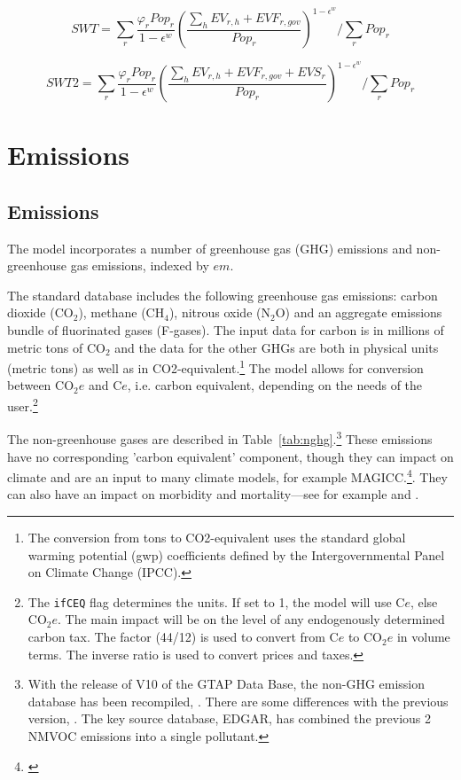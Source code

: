 \documentclass[11pt,letterpaper]{report}
\begin{document}
\begin{equation}
\label{eq:swt}
\mathit{SWT} = \sum_{r}{ \frac{\varphi_r \mathit{Pop}_r}{1-\epsilon^w}
\left(\frac{\sum_h{\mathit{EV}_{r,h}}+\mathit{EVF}_{r,gov}}{\mathit{Pop}_r} \right) }^{1-\epsilon^w} \bigg /
\sum_{r}{\mathit{Pop}_r}
\end{equation}

\begin{equation}
\label{eq:swt2}
\mathit{SWT2} = \sum_{r}{ \frac{\varphi_r \mathit{Pop}_r}{1-\epsilon^w}
\left(\frac{\sum_h{\mathit{EV}_{r,h}}+\mathit{EVF}_{r,gov}
+\mathit{EVS}_r}{\mathit{Pop}_r} \right) }^{1-\epsilon^w} \bigg /
\sum_{r}{\mathit{Pop}_r}
\end{equation}

\section{Emissions}
\renewcommand{\theequation}{{E-}\arabic{equation}}
\setcounter{equation}{0}

\subsection{Emissions}

The model incorporates a number of greenhouse gas (GHG) emissions and
non-greenhouse gas emissions, indexed by
$\mathit{em}$.

The standard database includes the following greenhouse
gas emissions: carbon dioxide ($\textrm{CO}_2$), methane
($\textrm{CH}_4$), nitrous oxide ($\textrm{N}_2\textrm{O}$) and an aggregate
emissions bundle of fluorinated gases (F-gases). The input data for carbon is in
millions of metric tons of $\textrm{CO}_2$ and the data for the other GHGs are
both in physical units (metric tons) as well as in
CO2-equivalent.\footnote{The conversion from tons to CO2-equivalent uses the
standard global warming potential (gwp) coefficients defined by the
Intergovernmental Panel on Climate Change (IPCC).} The model allows for
conversion between $\textrm{CO}_2e$ and {C$e$}, i.e. carbon equivalent,
depending on the needs of the user.\footnote{The \texttt{ifCEQ} flag determines
the units. If set to 1, the model will use C$e$, else $\textrm{CO}_2e$. The main
impact will be on the level of any endogenously determined carbon tax. The
factor (44/12) is used to convert from C$e$ to $\textrm{CO}_2e$ in volume terms.
The inverse ratio is used to convert prices and taxes.}

The non-greenhouse gases are described in Table~\ref{tab:nghg}.\footnote{With the release of V10 of the GTAP Data Base, the non-GHG emission database has been
recompiled, \cite{Chepeliev2020}. There are some differences with the
previous version, \cite{Chepeliev2018}. The key source database, EDGAR,
has combined the previous 2 NMVOC emissions into a single pollutant.}
These emissions have no corresponding 'carbon equivalent'
component, though they can impact on climate and are an input to many
climate models, for example MAGICC.\footnote{\cite{MAGICC6Pt12011}}. They
can also have an impact on morbidity and mortality---see for example
\cite{ChepelievvdMGEA20} and \cite{OECDNGHG2016}.
\end{document}
